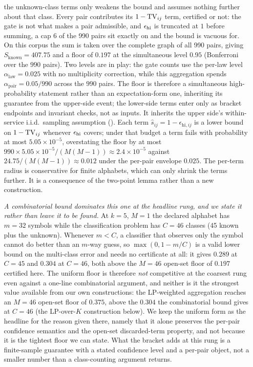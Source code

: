 the unknown-class terms only weakens the bound and assumes nothing further about
that class. Every pair contributes its $1 - \mathrm{TV}_{ij}$ term, certified or not: the
gate is not what makes a pair admissible, and $\epsilon_{\mathrm{hi}}$ is truncated at $1$ before
summing, a cap $6$ of the 990 pairs sit exactly on and the bound is vacuous for.
On this corpus the sum is taken over the complete graph of all 990 pairs, giving
$S_{\mathrm{known}} = 407.75$ and a floor of $0.197$ at the simultaneous level
$0.95$ (Bonferroni over the $990$ pairs). Two levels are in play: the gate counts
use the per-law level $\alpha_{\mathrm{law}} = 0.025$ with no multiplicity
correction, while this aggregation spends $\alpha_{\mathrm{pair}} = 0.05/990$
across the $990$ pairs. The floor is therefore a simultaneous high-probability
statement rather than an expectation-form one, inheriting its guarantee from the
upper-side event; the lower-side terms enter only as bracket endpoints and
invariant checks, not as inputs. It inherits the upper side's within-service
i.i.d.\ sampling assumption (). Each term
$\widehat{s}_{ij} = 1 - \epsilon_{\mathrm{hi},ij}$ is a lower bound on
$1 - \mathrm{TV}_{ij}$ whenever $\epsilon_{\mathrm{hi}}$ covers; under that budget a term fails with
probability at most $5.05\times10^{-5}$, overstating the floor by at most
$990\times5.05\times10^{-5}/(M(M-1)) \approx 2.4\times10^{-5}$ against
$24.75/(M(M-1)) \approx 0.012$ under the per-pair envelope $0.025$. The per-term
radius is conservative for finite alphabets, which can only shrink the terms
further. It is a consequence of the two-point lemma rather than a new
construction.

\emph{A combinatorial bound dominates this one at the headline rung, and we state
it rather than leave it to be found.} At $k{=}5$, $M{=}1$ the declared alphabet
has $m = 32$ symbols while the classification problem has $C = 46$ classes (45
known plus the unknown). Whenever $m < C$, a classifier that observes only the
symbol cannot do better than an $m$-way guess, so {\small $\max(0, 1 - m/C)$} is a
valid lower bound on the multi-class error and needs no certificate at all: it
gives $0.289$ at $C{=}45$ and $0.304$ at $C{=}46$, both above the $M{=}46$
open-set floor of $0.197$ certified here. The uniform floor is therefore \emph{not} competitive at the
coarsest rung even against a one-line combinatorial argument, and neither is it
the strongest value available from our own constructions: the LP-weighted
aggregation reaches an $M{=}46$ open-set floor of $0.375$, above the $0.304$ the
combinatorial bound gives at $C{=}46$ (the LP-over-$K$ construction
below). We keep the uniform form as the headline for the reason given there,
namely that it alone preserves the per-pair confidence semantics and the
open-set discarded-term property, and not because it is the tightest floor we
can state. What the bracket adds at this
rung is a finite-sample guarantee with a stated confidence level and a per-pair
object, not a smaller number than a class-counting argument returns.

